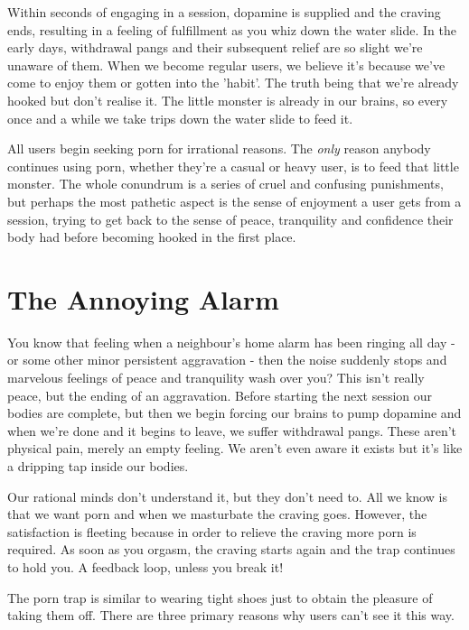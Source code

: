 \documentclass[
]{book}
\begin{document}
Within seconds of engaging in a session, dopamine is supplied and the craving ends, resulting in a feeling of fulfillment as you whiz down the water slide. In the early days, withdrawal pangs and their subsequent relief are so slight we're unaware of them. When we become regular users, we believe it's because we've come to enjoy them or gotten into the 'habit'. The truth being that we're already hooked but don't realise it. The little monster is already in our brains, so every once and a while we take trips down the water slide to feed it.

All users begin seeking porn for irrational reasons. The \emph{only} reason anybody continues using porn, whether they're a casual or heavy user, is to feed that little monster. The whole conundrum is a series of cruel and confusing punishments, but perhaps the most pathetic aspect is the sense of enjoyment a user gets from a session, trying to get back to the sense of peace, tranquility and confidence their body had before becoming hooked in the first place.

\hypertarget{the-annoying-alarm}{%
\section{The Annoying Alarm}\label{the-annoying-alarm}}

You know that feeling when a neighbour's home alarm has been ringing all day - or some other minor persistent aggravation - then the noise suddenly stops and marvelous feelings of peace and tranquility wash over you? This isn't really peace, but the ending of an aggravation. Before starting the next session our bodies are complete, but then we begin forcing our brains to pump dopamine and when we're done and it begins to leave, we suffer withdrawal pangs. These aren't physical pain, merely an empty feeling. We aren't even aware it exists but it's like a dripping tap inside our bodies.

Our rational minds don't understand it, but they don't need to. All we know is that we want porn and when we masturbate the craving goes. However, the satisfaction is fleeting because in order to relieve the craving more porn is required. As soon as you orgasm, the craving starts again and the trap continues to hold you. A feedback loop, unless you break it!

The porn trap is similar to wearing tight shoes just to obtain the pleasure of taking them off. There are three primary reasons why users can't see it this way.
\end{document}
